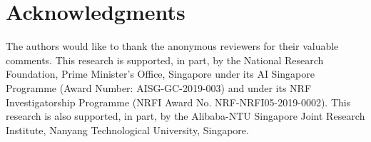 \documentclass[11pt,a4paper]{article}
\begin{document}
\section*{Acknowledgments}
The authors would like to thank the anonymous reviewers for their valuable comments. This research is supported, in part, by the National Research Foundation, Prime Minister’s Office, Singapore under its AI Singapore Programme (Award Number: AISG-GC-2019-003) and under its NRF Investigatorship Programme (NRFI Award No. NRF-NRFI05-2019-0002). This research is also supported, in part, by the Alibaba-NTU Singapore Joint Research Institute, Nanyang Technological University, Singapore.


\end{document}
